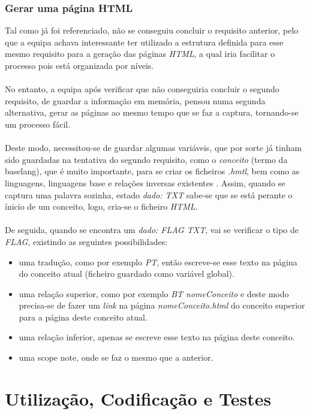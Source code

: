 \documentclass[11pt,a4paper]{report}%
\begin{document}
\subsection{Gerar uma página HTML}

Tal como já foi referenciado, não se conseguiu concluir o requisito anterior, pelo que a equipa achava interessante ter utilizado a estrutura definida para esse mesmo requisito para a geração das páginas \emph{HTML}, a qual iria facilitar o processo pois está organizada por níveis.\\\\ No entanto, a equipa após verificar que não conseguiria concluir o segundo requisito, de guardar a informação em memória, pensou numa segunda alternativa, gerar as páginas ao mesmo tempo que se faz a captura, tornando-se um processo fácil.\\\\Deste modo, necessitou-se de guardar algumas variáveis, que por sorte já tinham sido guardadas na tentativa do segundo requisito, como o \emph{conceito} (termo da baselang), que é muito importante, para se criar os ficheiros \emph{.hmtl}, bem como as linguagens,  linguagens base e relações inversas existentes . Assim, quando se captura uma palavra sozinha, estado \emph{dado: TXT} sabe-se que se está perante o ínicio de um conceito, logo, cria-se o ficheiro \emph{HTML}.\\\\De seguida, quando se encontra um \emph{dado: FLAG TXT}, vai se verificar o tipo de \emph{FLAG}, existindo as seguintes possibilidades:

\begin{itemize}
    \item uma tradução, como por exemplo \emph{PT}, então escreve-se esse texto na página do conceito atual (ficheiro guardado como variável global).
    \item uma relação superior, como por exemplo \emph{BT nomeConceito} e deste modo precisa-se de fazer um \emph{link} na página \emph{nomeConceito.html} do conceito superior para a página deste conceito atual.
    \item uma relação inferior, apenas se escreve esse texto na página deste conceito.
    \item uma scope note, onde se faz o mesmo que a anterior.
\end{itemize}

\chapter{Utilização, Codificação e Testes}
\end{document}
